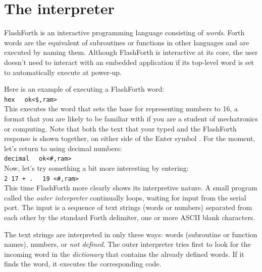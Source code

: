 \documentclass[12pt,a4paper]{article}
\begin{document}
\newpage
\section{The interpreter}
\label{sec:interpreter}
%
FlashForth is an interactive programming language consisting of \textit{words}.
Forth words are the equivalent of subroutines or functions in other languages and are
executed by naming them.
Although FlashForth is interactive at its core, the user doesn't need to
interact with an embedded application if its top-level word is set to automatically
execute at power-up.

\medskip
Here is an example of executing a FlashForth word: \vspace{7pt} \\
\verb!hex! \fbox{$\hookleftarrow$} \verb!  ok<$,ram>! \vspace{7pt} \\
This executes the word that sets the base for representing numbers to 16, 
a format that you are likely to be familiar with
if you are a student of mechatronics or computing.
Note that both the text that your typed and the FlashForth response is shown
together, on either side of the Enter symbol \fbox{$\hookleftarrow$}.
For the moment, let's return to using decimal numbers: \vspace{7pt} \\
\verb!decimal! \fbox{$\hookleftarrow$} \verb!  ok<#,ram>! \vspace{7pt} \\

\medskip
Now, let's try something a bit more interesting by entering: \vspace{7pt} \\
\verb!2 17 + .! \fbox{$\hookleftarrow$} \verb!  19 <#,ram>! \vspace{7pt} \\
This time FlashForth more clearly shows its interpretive nature.
A small program called the \textit{outer interpreter} continually loops,
waiting for input from the serial port.
The input is a sequence of text strings (words or numbers) separated from each other
by the standard Forth delimiter, one or more ASCII blank characters.

\medskip
The text strings are interpreted in only three ways: words (subroutine or function names),
numbers, or \textit{not defined}.
The outer interpreter tries first to look for the incoming word in the \textit{dictionary}
that contains the already defined words.
If it finds the word, it executes the corresponding code.
\end{document}
